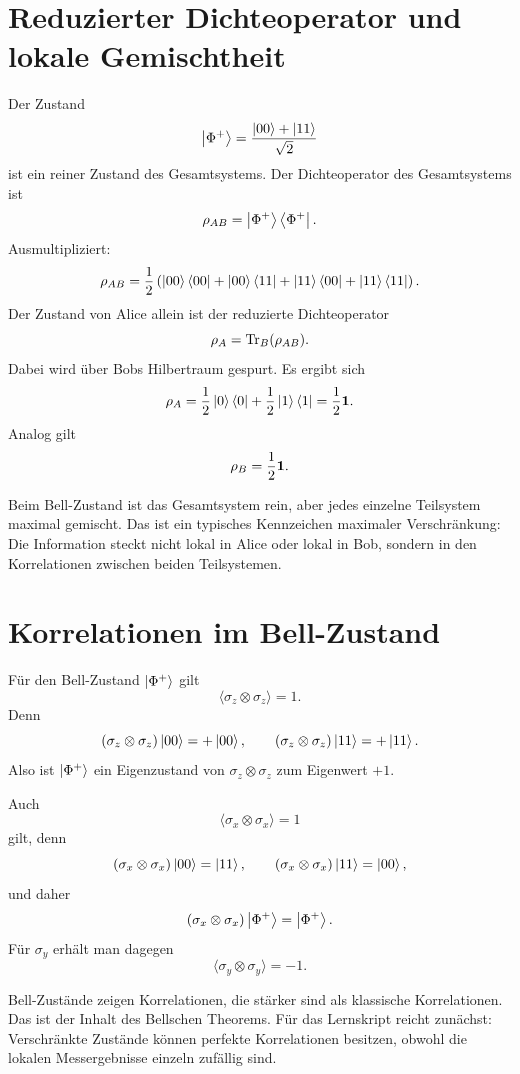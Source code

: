 \section{Reduzierter Dichteoperator und lokale Gemischtheit}

Der Zustand
\[
    \left|\Phi^+\right\rangle=\frac{\left|00\right\rangle+\left|11\right\rangle}{\sqrt2}
\]
ist ein reiner Zustand des Gesamtsystems. Der Dichteoperator des Gesamtsystems ist
\[
    \rho_{AB}=\left|\Phi^+\right\rangle\left\langle\Phi^+\right|.
\]
Ausmultipliziert:
\[
    \rho_{AB}
    =\frac12\left(
    \left|00\right\rangle\left\langle00\right|
    +\left|00\right\rangle\left\langle11\right|
    +\left|11\right\rangle\left\langle00\right|
    +\left|11\right\rangle\left\langle11\right|
    \right).
\]
Der Zustand von Alice allein ist der reduzierte Dichteoperator
\[
    \rho_A=\operatorname{Tr}_B(\rho_{AB}).
\]
Dabei wird über Bobs Hilbertraum gespurt. Es ergibt sich
\[
    \rho_A=\frac12\left|0\right\rangle\left\langle0\right|+\frac12\left|1\right\rangle\left\langle1\right|
    =\frac12\mathbf{1}.
\]
Analog gilt
\[
    \rho_B=\frac12\mathbf{1}.
\]

\begin{conceptbox}
Beim Bell-Zustand ist das Gesamtsystem rein, aber jedes einzelne Teilsystem maximal gemischt. Das ist ein typisches Kennzeichen maximaler Verschränkung: Die Information steckt nicht lokal in Alice oder lokal in Bob, sondern in den Korrelationen zwischen beiden Teilsystemen.
\end{conceptbox}

\section{Korrelationen im Bell-Zustand}

Für den Bell-Zustand \(\left|\Phi^+\right\rangle\) gilt
\[
    \langle \sigma_z\otimes\sigma_z\rangle=1.
\]
Denn
\[
    (\sigma_z\otimes\sigma_z)\left|00\right\rangle=+\left|00\right\rangle,
    \qquad
    (\sigma_z\otimes\sigma_z)\left|11\right\rangle=+\left|11\right\rangle.
\]
Also ist \(\left|\Phi^+\right\rangle\) ein Eigenzustand von \(\sigma_z\otimes\sigma_z\) zum Eigenwert \(+1\).

Auch
\[
    \langle \sigma_x\otimes\sigma_x\rangle=1
\]
gilt, denn
\[
    (\sigma_x\otimes\sigma_x)\left|00\right\rangle=\left|11\right\rangle,
    \qquad
    (\sigma_x\otimes\sigma_x)\left|11\right\rangle=\left|00\right\rangle,
\]
und daher
\[
    (\sigma_x\otimes\sigma_x)\left|\Phi^+\right\rangle=\left|\Phi^+\right\rangle.
\]
Für \(\sigma_y\) erhält man dagegen
\[
    \langle \sigma_y\otimes\sigma_y\rangle=-1.
\]

\begin{notebox}
Bell-Zustände zeigen Korrelationen, die stärker sind als klassische Korrelationen. Das ist der Inhalt des Bellschen Theorems. Für das Lernskript reicht zunächst: Verschränkte Zustände können perfekte Korrelationen besitzen, obwohl die lokalen Messergebnisse einzeln zufällig sind.
\end{notebox}


